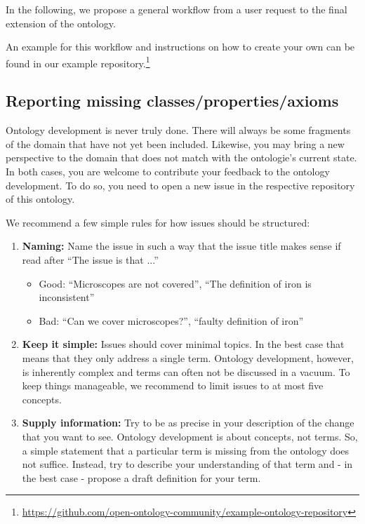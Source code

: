 In the following, we propose a general workflow from a user request to the final extension of the ontology.

An example for this workflow and instructions on how to create your own can be found in our example repository.\footnote{\url{https://github.com/open-ontology-community/example-ontology-repository}}

\subsection{Reporting missing classes/properties/axioms}


Ontology development is never truly done. There will always be some fragments of the domain that have not yet been included. Likewise, you may bring a new perspective to the domain that does not match with the ontologie's current state. In both cases, you are welcome to contribute your feedback to the ontology development. To do so, you need to open a new issue in the respective {\github} repository of this ontology. 

We recommend a few simple rules for how issues should be structured:

\begin{enumerate}
    \item \textbf{Naming:} Name the issue in such a way that the issue title makes sense if read after ``The issue is that ...''
    \begin{itemize}
        \item Good: ``Microscopes are not covered'', ``The definition of iron is inconsistent''
        \item Bad: ``Can we cover microscopes?'', ``faulty definition of iron''
    \end{itemize}
    \item \textbf{Keep it simple:} Issues should cover minimal topics. In the best case that means that they only address a single term. Ontology development, however, is inherently complex and terms can often not be discussed in a vacuum. To keep things manageable, we recommend to limit issues to at most five concepts.
    \item \textbf{Supply information:} Try to be as precise in your description of the change that you want to see. Ontology development is about concepts, not terms. So, a simple statement that a particular term is missing from the ontology does not suffice. Instead, try to describe your understanding of that term and - in the best case - propose a draft definition for your term. 
\end{enumerate}

